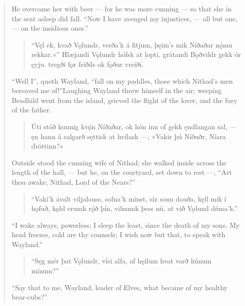 \begin{verse}
\bvb He overcame her with beer — for he was more cunning — so that she in the seat asleep did fall. “Now I have avenged my injustices, — all but one, — on the insidious ones\footnotemark[1].”

\begin{verse}
\bva “Vęl ek, kvað Vǫlundr, \hld verða’k á fitjum,
þęim’s mik Níðaðar \hld nǫ́mu rekkar.«”
Hlæjandi Vǫlundr \hld hófsk at lopti,
grátandi Bǫðvildr \hld gekk ór ęyju.
tregði fǫr friðils \hld ok fǫður vreiði. \\%
\end{verse}

\bvb “Well I”, quoth Wayland, “fall on my paddles, those which Nithad’s men bereaved me of!”\footnotemark[1] Laughing Wayland threw himself in the air; weeping Beadhild went from the island, grieved the flight of the lover, and the fury of the father.

\begin{verse}
\bva Úti stóð kunnig \hld kvǫ́n Níðaðar,
ok hón inn of gekk \hld ęndlangan sal,
— ęn hann á salgarð \hld sęttisk at hvílask —,
»Vakir þú Níðuðr, \hld Níara dróttinn?«  \\%
\end{verse}

\bvb Outside stood the cunning wife of Nithad; she walked inside across the length of the hall, — but he, on the courtyard, set down to rest —, “Art thou awake, Nithad, Lord of the Nears?”

\begin{verse}
\bva “Vaki’k ávalt \hld viljalauss,
sofna’k minst, \hld síz sonu dauða,
kęll mik í hǫfuð, \hld kǫld erumk rǫ́ð þín,
vilnumk þess nú, \hld at við Vǫlund dǿma’k.” \\%
\end{verse}

\bvb “I wake always, powerless; I sleep the least, since the death of my sons. My head freezes, cold are thy counsels; I wish now but that, to speak with Wayland.”

\begin{verse}
\bva “Sęg mér þat Vǫlundr, \hld vísi alfa,
af hęilum hvat varð \hld húnum mínum?” \\%
\end{verse}

\bvb “Say that to me, Wayland, leader of Elves, what became of my healthy bear-cubs?”


\end{verse}
